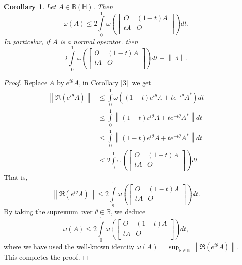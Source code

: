 \documentclass[12pt,twoside,reqno]{amsart}
\newtheorem{corollary}{Corollary}[section]
\numberwithin{equation}{section}
\begin{document}
\begin{corollary}\label{4}
Let $A\in \mathbb B\left( \mathbb H \right)$. Then
\[\omega \left( A \right)\le 2\int\limits_{0}^{1}{\omega \left( \left[ \begin{matrix}
   O & \left( 1-t \right)A  \\
   tA & O  \\
\end{matrix} \right] \right)dt}.\]
In particular, if $A$ is a normal operator, then
\[2\int\limits_{0}^{1}{\omega \left( \left[ \begin{matrix}
   O & \left( 1-t \right)A  \\
   tA & O  \\
\end{matrix} \right] \right)dt}=\left\| A \right\|.\]
\end{corollary}
\begin{proof}
Replace $A$ by ${{e}^{i\theta }}A$, in Corollary \ref{3}, we get
\[\begin{aligned}
   \left\| \Re\left( {{e}^{i\theta }}A \right) \right\|&\le \int\limits_{0}^{1}{\omega \left( \left( 1-t \right){{e}^{i\theta }}A+t{{e}^{-i\theta }}{{A}^{*}} \right)dt} \\ 
 & \le \int\limits_{0}^{1}{\left\| \left( 1-t \right){{e}^{i\theta }}A+t{{e}^{-i\theta }}{{A}^{*}} \right\|dt} \\ 
 & \le \int\limits_{0}^{1}{\left\| \left( 1-t \right){{e}^{i\theta }}A+t{{e}^{-i\theta }}{{A}^{*}} \right\|dt} \\ 
 & \le 2\int\limits_{0}^{1}{\omega \left( \left[ \begin{matrix}
   O & \left( 1-t \right)A  \\
   tA & O  \\
\end{matrix} \right] \right)dt}.  
\end{aligned}\]
That is,
\[\left\| \Re\left( {{e}^{i\theta }}A \right) \right\|\le 2\int\limits_{0}^{1}{\omega \left( \left[ \begin{matrix}
   O & \left( 1-t \right)A  \\
   tA & O  \\
\end{matrix} \right] \right)dt}.\]
By taking the supremum over $\theta \in \mathbb{R}$, we deduce
\[\omega \left( A \right)\le 2\int\limits_{0}^{1}{\omega \left( \left[ \begin{matrix}
   O & \left( 1-t \right)A  \\
   tA & O  \\
\end{matrix} \right] \right)dt},\]
where we have used the well-known identity $\omega(A)=\sup_{\theta\in\mathbb{R}}\left\|\Re\left(e^{i\theta}A\right)\right\|.$ This completes the proof.
\end{proof}
\end{document}
